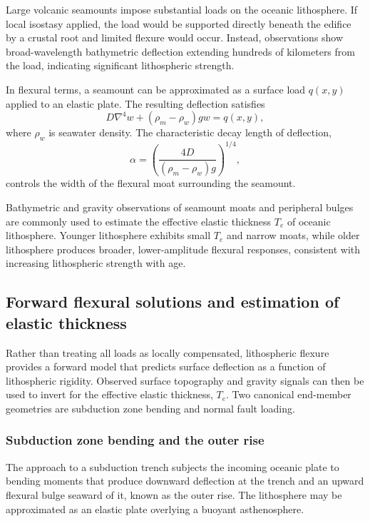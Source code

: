 Large volcanic seamounts impose substantial loads on the oceanic lithosphere. If local isostasy applied, the load would be supported directly beneath the edifice by a crustal root and limited flexure would occur. Instead, observations show broad-wavelength bathymetric deflection extending hundreds of kilometers from the load, indicating significant lithospheric strength.

In flexural terms, a seamount can be approximated as a surface load \( q(x,y) \) applied to an elastic plate. The resulting deflection satisfies
\begin{equation}
D \nabla^4 w + (\rho_m - \rho_w) g w = q(x,y),
\end{equation}
where \( \rho_w \) is seawater density. The characteristic decay length of deflection,
\[
\alpha = \left( \frac{4D}{(\rho_m - \rho_w) g} \right)^{1/4},
\]
controls the width of the flexural moat surrounding the seamount.

Bathymetric and gravity observations of seamount moats and peripheral bulges are commonly used to estimate the effective elastic thickness \(T_e\) of oceanic lithosphere. Younger lithosphere exhibits small \(T_e\) and narrow moats, while older lithosphere produces broader, lower-amplitude flexural responses, consistent with increasing lithospheric strength with age.

\subsection{Forward flexural solutions and estimation of elastic thickness}

Rather than treating all loads as locally compensated, lithospheric flexure provides a forward model that predicts surface deflection as a function of lithospheric rigidity. Observed surface topography and gravity signals can then be used to invert for the effective elastic thickness, \(T_e\). Two canonical end-member geometries are subduction zone bending and normal fault loading.

\subsubsection{Subduction zone bending and the outer rise}

The approach to a subduction trench subjects the incoming oceanic plate to bending moments that produce downward deflection at the trench and an upward flexural bulge seaward of it, known as the outer rise. The lithosphere may be approximated as an elastic plate overlying a buoyant asthenosphere.

